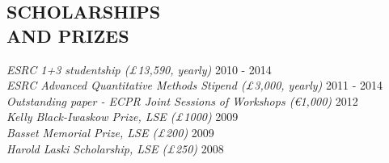 \documentclass[line,margin]{res}
\begin{document}
\begin{resume}




			
\section{SCHOLARSHIPS \\ AND PRIZES}  {
{\sl ESRC 1+3 studentship (\pounds 13,590, yearly)} \hfill 2010 - 2014 \\
{\sl ESRC Advanced Quantitative Methods Stipend (\pounds 3,000, yearly)} \hfill 2011 - 2014 \\
{\sl Outstanding paper - ECPR Joint Sessions of Workshops (\euro 1,000)} \hfill 2012 \\
{\sl Kelly Black-Iwaskow Prize, LSE (\pounds 1000)} \hfill 2009 \\
{\sl Basset Memorial Prize, LSE (\pounds 200)} \hfill 2009 \\
\sl Harold Laski Scholarship, LSE (\pounds 250)} \hfill 2008 \\







\end{resume}
\end{document}
